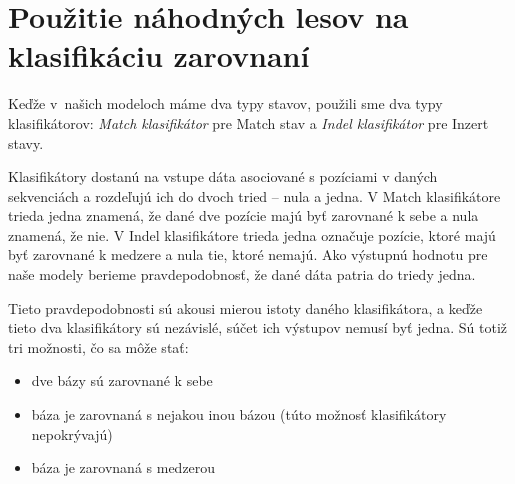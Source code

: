 \todo

\section{Použitie náhodných lesov na klasifikáciu zarovnaní}


Keďže v~našich modeloch máme dva typy stavov, použili sme dva typy klasifikátorov: \textit{Match klasifikátor} pre Match stav a \textit{Indel klasifikátor} pre Inzert stavy.

Klasifikátory dostanú na vstupe dáta asociované s pozíciami v daných sekvenciách a rozdeľujú ich do dvoch tried -- nula a jedna. V Match klasifikátore trieda jedna znamená, že dané dve pozície majú byť zarovnané k sebe a nula znamená, že nie. V Indel klasifikátore trieda jedna označuje pozície, ktoré majú byť zarovnané k medzere a nula tie, ktoré nemajú. Ako výstupnú hodnotu pre naše modely berieme pravdepodobnosť, že dané dáta patria do triedy jedna.

Tieto pravdepodobnosti sú akousi mierou istoty daného klasifikátora, a keďže tieto dva klasifikátory sú nezávislé, súčet ich výstupov nemusí byť jedna. Sú totiž tri možnosti, čo sa môže stať:
\begin{itemize}
    \item dve bázy sú zarovnané k sebe
    \item báza je zarovnaná s nejakou inou bázou (túto možnosť klasifikátory nepokrývajú)
    \item báza je zarovnaná s medzerou
\end{itemize}


